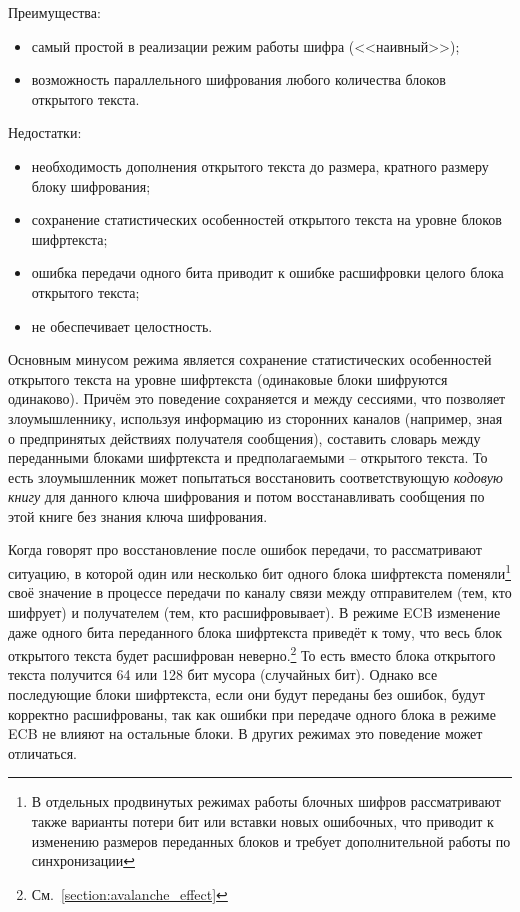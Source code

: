 
Преимущества:
\begin{itemize}
	\item самый простой в реализации режим работы шифра (<<наивный>>);
	\item возможность параллельного шифрования любого количества блоков открытого текста.
\end{itemize}

Недостатки:
\begin{itemize}
	\item необходимость дополнения открытого текста до размера, кратного размеру блоку шифрования;
	\item сохранение статистических особенностей открытого текста на уровне блоков шифртекста;
	\item ошибка передачи одного бита приводит к ошибке расшифровки целого блока открытого текста;
	\item не обеспечивает целостность.
\end{itemize}

Основным минусом режима является сохранение статистических особенностей открытого текста на уровне шифртекста (одинаковые блоки шифруются одинаково). Причём это поведение сохраняется и между сессиями, что позволяет злоумышленнику, используя информацию из сторонних каналов (например, зная о предпринятых действиях получателя сообщения), составить словарь между переданными блоками шифртекста и предполагаемыми -- открытого текста. То есть злоумышленник может попытаться восстановить соответствующую \emph{кодовую книгу} для данного ключа шифрования и потом восстанавливать сообщения по этой книге без знания ключа шифрования.

Когда говорят про восстановление после ошибок передачи, то рассматривают ситуацию, в которой один или несколько бит одного блока шифртекста поменяли\footnote{В отдельных продвинутых режимах работы блочных шифров рассматривают также варианты потери бит или вставки новых ошибочных, что приводит к изменению размеров переданных блоков и требует дополнительной работы по синхронизации} своё значение в процессе передачи по каналу связи между отправителем (тем, кто шифрует) и получателем (тем, кто расшифровывает). В режиме ECB изменение даже одного бита переданного блока шифртекста приведёт к тому, что весь блок открытого текста будет расшифрован неверно.\footnote{См.~\autoref{section:avalanche_effect}} То есть вместо блока открытого текста получится 64 или 128 бит мусора (случайных бит). Однако все последующие блоки шифртекста, если они будут переданы без ошибок, будут корректно расшифрованы, так как ошибки при передаче одного блока в режиме ECB не влияют на остальные блоки. В других режимах это поведение может отличаться.

